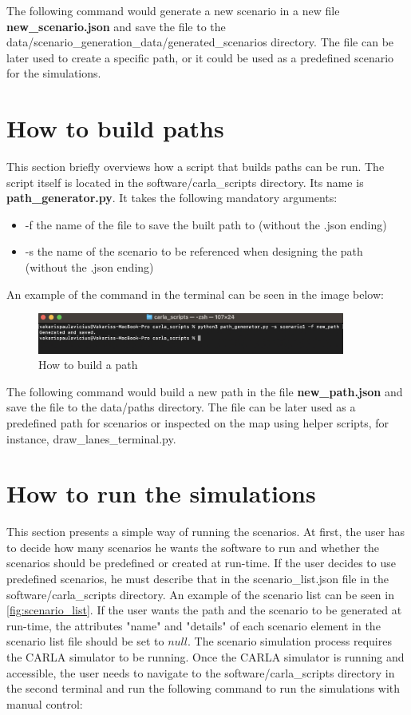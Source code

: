 The following command would generate a new scenario in a new file \textbf{new\_scenario.json} and save the file to the data/scenario\_generation\_data/generated\_scenarios directory. The file can be later used to create a specific path, or it could be used as a predefined scenario for the simulations.

\section{How to build paths} \label{sect:b.2}
This section briefly overviews how a script that builds paths can be run. The script itself is located in the software/carla\_scripts directory. Its name is \textbf{path\_generator.py}. It takes the following mandatory arguments:
\begin{itemize}
  \item -f the name of the file to save the built path to (without the .json ending)
  \item -s the name of the scenario to be referenced when designing the path (without the .json ending)
\end{itemize}

An example of the command in the terminal can be seen in the image below:

\begin{figure} [h]
    \centering
    \includegraphics[width = 0.9\textwidth]{research_paper/Images/build_path.png}
    \caption{How to build a path}
\end{figure}

The following command would build a new path in the file \textbf{new\_path.json} and save the file to the data/paths directory. The file can be later used as a predefined path for scenarios or inspected on the map using helper scripts, for instance, draw\_lanes\_terminal.py.

\section{How to run the simulations} \label{sect:b.3}

This section presents a simple way of running the scenarios. At first, the user has to decide how many scenarios he wants the software to run and whether the scenarios should be predefined or created at run-time. If the user decides to use predefined scenarios, he must describe that in the scenario\_list.json file in the software/carla\_scripts directory. An example of the scenario list can be seen in \autoref{fig:scenario_list}. If the user wants the path and the scenario to be generated at run-time, the attributes "name" and "details" of each scenario element in the scenario list file should be set to $null$. The scenario simulation process requires the CARLA simulator to be running. Once the CARLA simulator is running and accessible, the user needs to navigate to the software/carla\_scripts directory in the second terminal and run the following command to run the simulations with manual control:


